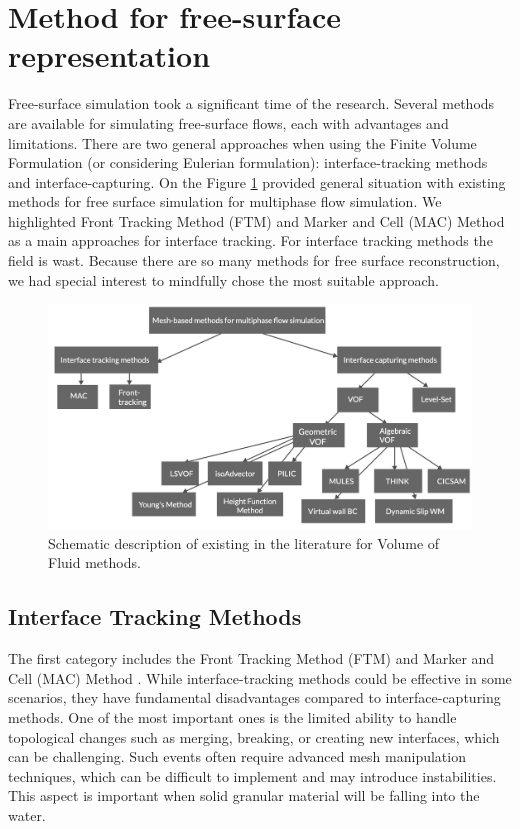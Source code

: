 \section{Method for free-surface representation} %

Free-surface simulation took a significant time of the research. Several methods are available for simulating free-surface flows, each with advantages and limitations. There are two general approaches when using the Finite Volume Formulation (or considering Eulerian formulation): interface-tracking methods and interface-capturing. On the Figure \ref{fig:vof_methods} provided general situation with existing methods for free surface simulation for multiphase flow simulation. We highlighted Front Tracking Method (FTM)\cite{front-tracking} and Marker and Cell (MAC) Method \cite{mac} as a main approaches for interface tracking. For interface tracking methods the field is wast. Because there are so many methods for free surface reconstruction, we had special interest to mindfully chose the most suitable approach.

\begin{figure}[!ht]
    \centering
    \includegraphics[width=16cm]{GWU_Thesis_Sarmakeeva/Images/chap1/VOF_methods.png}
    \caption{Schematic description of existing in the literature for Volume of Fluid methods.}
    \label{fig:vof_methods}
\end{figure}


\subsection{Interface Tracking Methods}

The first category includes the Front Tracking Method (FTM)\cite{front-tracking} and Marker and Cell (MAC) Method \cite{mac}. While interface-tracking methods could be effective in some scenarios, they have fundamental disadvantages compared to interface-capturing methods. One of the most important ones is the limited ability to handle topological changes such as merging, breaking, or creating new interfaces, which can be challenging. Such events often require advanced mesh manipulation techniques, which can be difficult to implement and may introduce instabilities. This aspect is important when solid granular material will be falling into the water.

